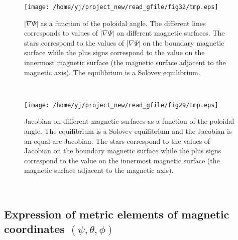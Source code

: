 \documentclass{llncs}
\begin{document}
\begin{figure}[h]
  \texttt{[image: /home/yj/project\_new/read\_gfile/fig32/tmp.eps]}
  \caption{$| \nabla \Psi |$ as a function of the poloidal angle. The
  different lines corresponds to values of $| \nabla \Psi |$ on different
  magnetic surfaces. The stars correspond to the values of $| \nabla \Psi |$
  on the boundary magnetic surface while the plus signs correspond to the
  value on the innermost magnetic surface (the magnetic surface adjacent to
  the magnetic axis). The equilibrium is a Solovev equilibrium.}
\end{figure}

\

\begin{figure}[h]
  \texttt{[image: /home/yj/project\_new/read\_gfile/fig29/tmp.eps]}
  \caption{Jacobian on different magnetic surfaces as a function of the
  poloidal angle. The equilibrium is a Solovev equilibrium and the Jacobian is
  an equal-arc Jacobian. The stars correspond to the values of Jacobian on the
  boundary magnetic surface while the plus signs correspond to the value on
  the innermost magnetic surface (the magnetic surface adjacent to the
  magnetic axis).}
\end{figure}

\

\subsection{Expression of metric elements of magnetic coordinates $(\psi,
\theta, \phi)$}
\end{document}
